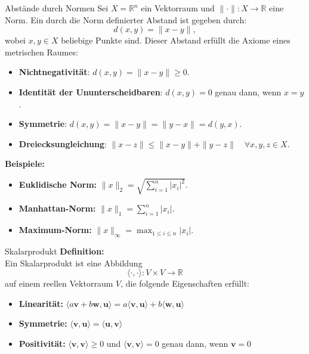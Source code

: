 \documentclass{beamer}
\begin{document}
  \begin{frame}{Abstände durch Normen}
    Sei \( X = \mathbb{R}^n \)  ein Vektorraum und \( \| \cdot \| : X \rightarrow \mathbb{R} \) eine Norm. Ein durch die Norm definierter Abstand ist gegeben durch:
    \[
    d(x, y) = \| x - y \|,
    \]
    wobei \( x, y \in X \) beliebige Punkte sind. Dieser Abstand erfüllt die Axiome eines metrischen Raumes:
    \begin{itemize}
      \item \textbf{Nichtnegativität}: \( d(x, y) = \| x - y \| \geq 0 \).
      \item \textbf{Identität der Ununterscheidbaren}: \( d(x, y) = 0 \) genau dann, wenn \( x = y \).
      \item \textbf{Symmetrie}: \( d(x, y) = \| x - y \| = \| y - x \| = d(y, x) \).
      \item \textbf{Dreiecksungleichung}: \( \| x - z \| \leq \| x - y \| + \| y - z \| \quad \forall x, y, z \in X \).
    \end{itemize}
    \textbf{Beispiele:}
    \begin{itemize}
      \item \textbf{Euklidische Norm:} \( \| x \|_2 = \sqrt{\sum_{i=1}^{n} |x_i|^2} \).
      \item \textbf{Manhattan-Norm:} \( \| x \|_1 = \sum_{i=1}^{n} |x_i| \).
      \item \textbf{Maximum-Norm:} \( \| x \|_\infty = \max_{1 \leq i \leq n} |x_i| \).
    \end{itemize}
  \end{frame}


  
  \begin{frame}{Skalarprodukt}
      \textbf{Definition:} \\
      Ein Skalarprodukt ist eine Abbildung 
      \[
      \langle \cdot, \cdot \rangle: V \times V \to \mathbb{R}
      \]
      auf einem reellen Vektorraum \( V \), die folgende Eigenschaften erfüllt:
      \begin{itemize}
          \item \textbf{Linearität:} \( \langle a \mathbf{v} + b \mathbf{w}, \mathbf{u} \rangle = a \langle \mathbf{v}, \mathbf{u} \rangle + b \langle \mathbf{w}, \mathbf{u} \rangle \)
          \item \textbf{Symmetrie:} \( \langle \mathbf{v}, \mathbf{u} \rangle = \langle \mathbf{u}, \mathbf{v} \rangle \)
          \item \textbf{Positivität:} \( \langle \mathbf{v}, \mathbf{v} \rangle \geq 0 \) und \( \langle \mathbf{v}, \mathbf{v} \rangle = 0 \) genau dann, wenn \( \mathbf{v} = 0 \)
      \end{itemize}
  \end{frame}
  
\end{document}
